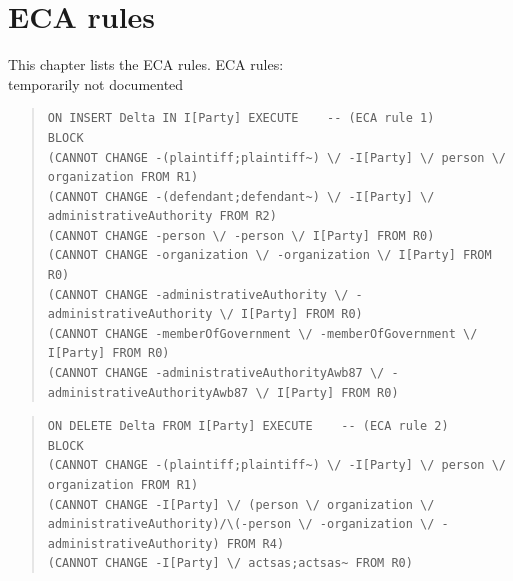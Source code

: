 \documentclass[10pt,a4paper]{report}              %
\theoremstyle{plain}\theorembodyfont{\rmfamily}\newtheorem{definition}{Definition}[section]
\theoremstyle{plain}\theorembodyfont{\rmfamily}\newtheorem{designrule}[definition]{Requirement}
\begin{document}
\chapter{ECA rules}\label{chpECA}

This chapter lists the ECA rules.
ECA rules:\\   temporarily not documented

\begin{quote}
\begin{verbatim}
ON INSERT Delta IN I[Party] EXECUTE    -- (ECA rule 1)
BLOCK
(CANNOT CHANGE -(plaintiff;plaintiff~) \/ -I[Party] \/ person \/ organization FROM R1)
(CANNOT CHANGE -(defendant;defendant~) \/ -I[Party] \/ administrativeAuthority FROM R2)
(CANNOT CHANGE -person \/ -person \/ I[Party] FROM R0)
(CANNOT CHANGE -organization \/ -organization \/ I[Party] FROM R0)
(CANNOT CHANGE -administrativeAuthority \/ -administrativeAuthority \/ I[Party] FROM R0)
(CANNOT CHANGE -memberOfGovernment \/ -memberOfGovernment \/ I[Party] FROM R0)
(CANNOT CHANGE -administrativeAuthorityAwb87 \/ -administrativeAuthorityAwb87 \/ I[Party] FROM R0)
\end{verbatim}
\end{quote}
\begin{quote}
\begin{verbatim}
ON DELETE Delta FROM I[Party] EXECUTE    -- (ECA rule 2)
BLOCK
(CANNOT CHANGE -(plaintiff;plaintiff~) \/ -I[Party] \/ person \/ organization FROM R1)
(CANNOT CHANGE -I[Party] \/ (person \/ organization \/ administrativeAuthority)/\(-person \/ -organization \/ -administrativeAuthority) FROM R4)
(CANNOT CHANGE -I[Party] \/ actsas;actsas~ FROM R0)
\end{verbatim}
\end{quote}
\end{document}
